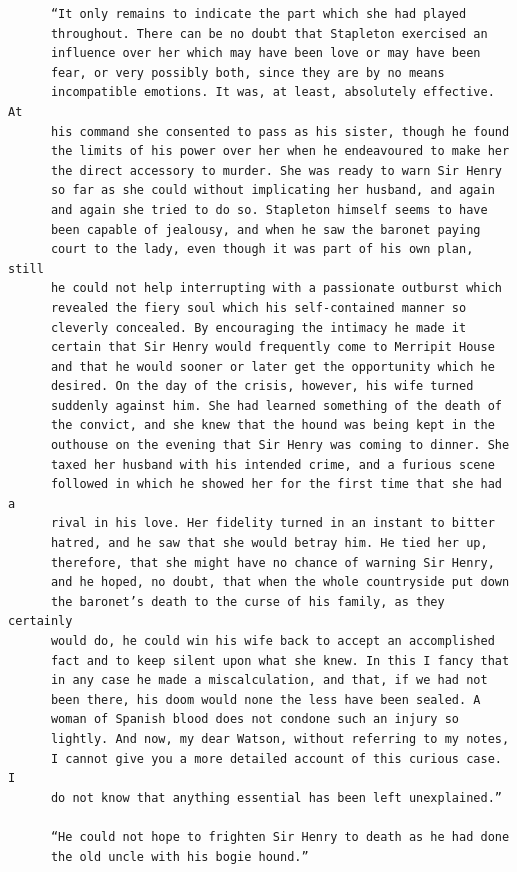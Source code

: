 \documentclass{article}
\begin{document}
\begin{verbatim}
      “It only remains to indicate the part which she had played
      throughout. There can be no doubt that Stapleton exercised an
      influence over her which may have been love or may have been
      fear, or very possibly both, since they are by no means
      incompatible emotions. It was, at least, absolutely effective. At
      his command she consented to pass as his sister, though he found
      the limits of his power over her when he endeavoured to make her
      the direct accessory to murder. She was ready to warn Sir Henry
      so far as she could without implicating her husband, and again
      and again she tried to do so. Stapleton himself seems to have
      been capable of jealousy, and when he saw the baronet paying
      court to the lady, even though it was part of his own plan, still
      he could not help interrupting with a passionate outburst which
      revealed the fiery soul which his self-contained manner so
      cleverly concealed. By encouraging the intimacy he made it
      certain that Sir Henry would frequently come to Merripit House
      and that he would sooner or later get the opportunity which he
      desired. On the day of the crisis, however, his wife turned
      suddenly against him. She had learned something of the death of
      the convict, and she knew that the hound was being kept in the
      outhouse on the evening that Sir Henry was coming to dinner. She
      taxed her husband with his intended crime, and a furious scene
      followed in which he showed her for the first time that she had a
      rival in his love. Her fidelity turned in an instant to bitter
      hatred, and he saw that she would betray him. He tied her up,
      therefore, that she might have no chance of warning Sir Henry,
      and he hoped, no doubt, that when the whole countryside put down
      the baronet’s death to the curse of his family, as they certainly
      would do, he could win his wife back to accept an accomplished
      fact and to keep silent upon what she knew. In this I fancy that
      in any case he made a miscalculation, and that, if we had not
      been there, his doom would none the less have been sealed. A
      woman of Spanish blood does not condone such an injury so
      lightly. And now, my dear Watson, without referring to my notes,
      I cannot give you a more detailed account of this curious case. I
      do not know that anything essential has been left unexplained.”

      “He could not hope to frighten Sir Henry to death as he had done
      the old uncle with his bogie hound.”


\end{verbatim}
\end{document}
